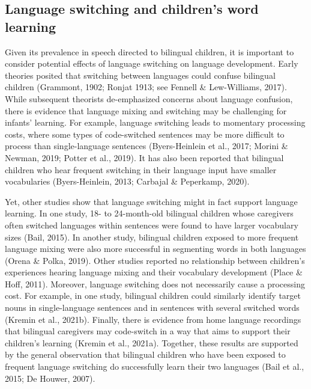 \documentclass[
  man,floatsintext]{apa7}
\begin{document}
\hypertarget{language-switching-and-childrens-word-learning}{%
\subsection{Language switching and children's word learning}\label{language-switching-and-childrens-word-learning}}

Given its prevalence in speech directed to bilingual children, it is important to consider potential effects of language switching on language development. Early theories posited that switching between languages could confuse bilingual children (Grammont, 1902; Ronjat 1913; see Fennell \& Lew-Williams, 2017). While subsequent theorists de-emphasized concerns about language confusion, there is evidence that language mixing and switching may be challenging for infants' learning. For example, language switching leads to momentary processing costs, where some types of code-switched sentences may be more difficult to process than single-language sentences (Byers-Heinlein et al., 2017; Morini \& Newman, 2019; Potter et al., 2019). It has also been reported that bilingual children who hear frequent switching in their language input have smaller vocabularies (Byers-Heinlein, 2013; Carbajal \& Peperkamp, 2020).

Yet, other studies show that language switching might in fact support language learning. In one study, 18- to 24-month-old bilingual children whose caregivers often switched languages within sentences were found to have larger vocabulary sizes (Bail, 2015). In another study, bilingual children exposed to more frequent language mixing were also more successful in segmenting words in both languages (Orena \& Polka, 2019). Other studies reported no relationship between children's experiences hearing language mixing and their vocabulary development (Place \& Hoff, 2011). Moreover, language switching does not necessarily cause a processing cost. For example, in one study, bilingual children could similarly identify target nouns in single-language sentences and in sentences with several switched words (Kremin et al., 2021b). Finally, there is evidence from home language recordings that bilingual caregivers may code-switch in a way that aims to support their children's learning (Kremin et al., 2021a). Together, these results are supported by the general observation that bilingual children who have been exposed to frequent language switching do successfully learn their two languages (Bail et al., 2015; De Houwer, 2007).
\end{document}
